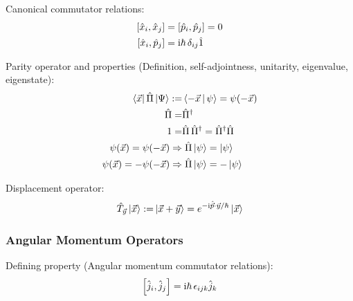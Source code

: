		\noindent
		Canonical commutator relations:
		\begin{equation}
			\begin{aligned}
				\left[ \hat{x}_i, \hat{x}_j \right] &= \left[ \hat{p}_i, \hat{p}_j \right] = 0 \\
				\left[ \hat{x}_i, \hat{p}_j \right] &= \mathrm{i}\hbar\, \delta_{ij}\hat{1} \\
			\end{aligned}
		\end{equation}

		\noindent
		Parity operator and properties (Definition, self-adjointness, unitarity, eigenvalue, eigenstate):
		\begin{equation}
			\begin{aligned}
				\Bra{\vec{x}} \hat{\Pi} \Ket{\Psi} :=& \Braket{-\vec{x} | \psi} = \psi(-\vec{x}) \\
				\hat{\Pi} =& \hat{\Pi}^\dagger\\
				1 =& \hat{\Pi} \,\hat{\Pi}^\dagger = \hat{\Pi}^\dagger \hat{\Pi} \\
				\psi(\vec{x}) = \psi(-\vec{x}) \Rightarrow&\; \hat{\Pi}\Ket{\psi} = \Ket{\psi} \\
				\psi(\vec{x}) = -\psi(-\vec{x}) \Rightarrow&\; \hat{\Pi}\Ket{\psi} = -\Ket{\psi} \\
			\end{aligned}
		\end{equation}

		\noindent
		Displacement operator:
		\begin{equation}
			\begin{aligned}
				\hat{T}_{\vec{y}}\Ket{\vec{x}} :=& \Ket{\vec{x} + \vec{y}} = e^{-\mathrm{i}\hat{\vec{p}}\cdot\vec{y}/\hbar}\Ket{\vec{x}} \\
			\end{aligned}
		\end{equation}

	\subsubsection{Angular Momentum Operators}
		\noindent
		Defining property (Angular momentum commutator relations):
		\begin{equation}
			\left[ \hat{j}_i, \hat{j}_j \right] = \mathrm{i}\hbar\, \epsilon_{ijk} \hat{j}_k
		\end{equation}

